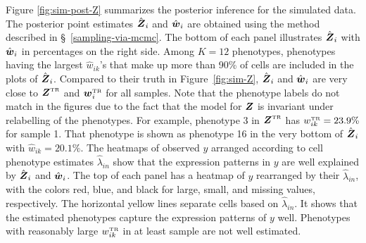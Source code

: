 \documentclass[12pt,]{article}
\def\beginmyfig{\begin{figure}[H]\center}
\def\endmyfig{\end{figure}}
\def\Z{\bm{Z}}
\newcommand{\true}{{\mbox{\tiny TR}}}
\newcommand{\bZ}{\mbox{\boldmath $Z$}}
\newcommand{\bw}{\mbox{\boldmath $w$}}
\def\beginmyfig{\begin{figure}[H]\center}
\def\endmyfig{\end{figure}}
\begin{document}
Figure \ref{fig:sim-post-Z} summarizes the posterior inference for the
simulated data.  The posterior point estimates $\hat{\bZ}_i$ and $\hat{\bw}_i$
are obtained using the method described in \S~\ref{sampling-via-mcmc}.  
%
The bottom of each panel illustrates $\hat{\bZ}_i$ with $\hat{\bw}_i$ in
percentages on the right side. Among $K=12$ phenotypes, phenotypes having the
largest $\hat{w}_{ik}$'s that make up more than 90\% of cells are included
in the plots of $\hat{\bZ}_i$. Compared to their truth in Figure~\ref{fig:sim-Z},
$\hat{\bZ}_i$ and $\hat{\bw}_i$ are very close to $\bZ^\true$ and $\bw_i^\true$
for all samples. Note that the phenotype labels do not match in the figures due
to the fact that the model for $\bZ$ is invariant under relabelling of the
phenotypes. For example, phenotype 3 in $\bZ^\true$ has $w^\true_{ik}=23.9\%$
for sample 1.  That phenotype is shown as phenotype 16 in the very bottom of
$\hat{\bZ}_i$ with $\hat{w}_{ik}=20.1\%$.
The heatmaps of observed $y$ arranged according to cell phenotype estimates $\hat{\lambda}_{in}$ show
that the expression patterns in $y$ are well explained by $\hat{\bZ}_i$ and
$\hat{\bw}_i$.  The top of each panel has a heatmap of $y$ rearranged by their
$\hat{\lambda}_{in}$, with the colors red, blue, and black for large, small, and
missing values, respectively.  The horizontal yellow lines separate cells based
on $\hat{\lambda}_{in}$.  It shows that the estimated phenotypes capture the
expression patterns of $y$ well. Phenotypes with reasonably large $w_{ik}^\true$ in at least sample are not well estimated.





\end{document}
